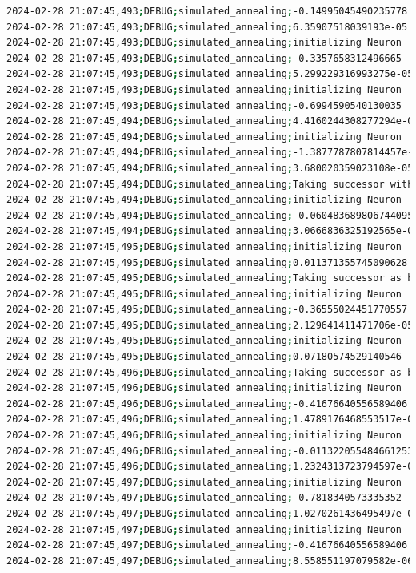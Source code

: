 \documentclass{article}
\begin{document}
\begin{lstlisting}[language=bash, caption=Example Output of Program]
2024-02-28 21:07:45,493;DEBUG;simulated_annealing;-0.14995045490235778
2024-02-28 21:07:45,493;DEBUG;simulated_annealing;6.35907518039193e-05
2024-02-28 21:07:45,493;DEBUG;simulated_annealing;initializing Neuron
2024-02-28 21:07:45,493;DEBUG;simulated_annealing;-0.3357658312496665
2024-02-28 21:07:45,493;DEBUG;simulated_annealing;5.299229316993275e-05
2024-02-28 21:07:45,493;DEBUG;simulated_annealing;initializing Neuron
2024-02-28 21:07:45,493;DEBUG;simulated_annealing;-0.6994590540130035
2024-02-28 21:07:45,494;DEBUG;simulated_annealing;4.4160244308277294e-05
2024-02-28 21:07:45,494;DEBUG;simulated_annealing;initializing Neuron
2024-02-28 21:07:45,494;DEBUG;simulated_annealing;-1.3877787807814457e-16
2024-02-28 21:07:45,494;DEBUG;simulated_annealing;3.680020359023108e-05
2024-02-28 21:07:45,494;DEBUG;simulated_annealing;Taking successor with probability 99% (exploration)
2024-02-28 21:07:45,494;DEBUG;simulated_annealing;initializing Neuron
2024-02-28 21:07:45,494;DEBUG;simulated_annealing;-0.060483689806744095
2024-02-28 21:07:45,494;DEBUG;simulated_annealing;3.0666836325192565e-05
2024-02-28 21:07:45,495;DEBUG;simulated_annealing;initializing Neuron
2024-02-28 21:07:45,495;DEBUG;simulated_annealing;0.011371355745090628
2024-02-28 21:07:45,495;DEBUG;simulated_annealing;Taking successor as better option (exploitation)
2024-02-28 21:07:45,495;DEBUG;simulated_annealing;initializing Neuron
2024-02-28 21:07:45,495;DEBUG;simulated_annealing;-0.36555024451770557
2024-02-28 21:07:45,495;DEBUG;simulated_annealing;2.129641411471706e-05
2024-02-28 21:07:45,495;DEBUG;simulated_annealing;initializing Neuron
2024-02-28 21:07:45,495;DEBUG;simulated_annealing;0.07180574529140546
2024-02-28 21:07:45,496;DEBUG;simulated_annealing;Taking successor as better option (exploitation)
2024-02-28 21:07:45,496;DEBUG;simulated_annealing;initializing Neuron
2024-02-28 21:07:45,496;DEBUG;simulated_annealing;-0.41676640556589406
2024-02-28 21:07:45,496;DEBUG;simulated_annealing;1.4789176468553517e-05
2024-02-28 21:07:45,496;DEBUG;simulated_annealing;initializing Neuron
2024-02-28 21:07:45,496;DEBUG;simulated_annealing;-0.011322055484661253
2024-02-28 21:07:45,496;DEBUG;simulated_annealing;1.2324313723794597e-05
2024-02-28 21:07:45,497;DEBUG;simulated_annealing;initializing Neuron
2024-02-28 21:07:45,497;DEBUG;simulated_annealing;-0.7818340573335352
2024-02-28 21:07:45,497;DEBUG;simulated_annealing;1.0270261436495497e-05
2024-02-28 21:07:45,497;DEBUG;simulated_annealing;initializing Neuron
2024-02-28 21:07:45,497;DEBUG;simulated_annealing;-0.41676640556589406
2024-02-28 21:07:45,497;DEBUG;simulated_annealing;8.558551197079582e-06

\end{lstlisting}
\end{document}
